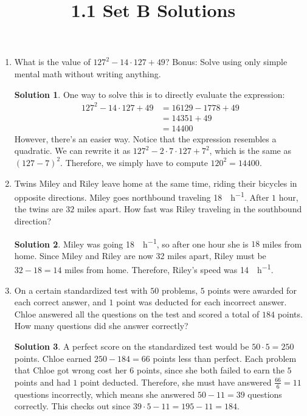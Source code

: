 \documentclass{article}
\title{1.1 Set B Solutions}
\author{}
\date{}
\theoremstyle{definition}
\newtheorem*{solution}{Solution}
\begin{document}
    \maketitle
    \begin{enumerate}
        \item What is the value of $127^2 - 14 \cdot 127 + 49$? Bonus: Solve using only simple mental math without writing anything.
        \begin{solution}
            One way to solve this is to directly evaluate the expression:
            \[\begin{split}
                127^2 - 14 \cdot 127 + 49 & = 16129 - 1778 + 49 \\
                & = 14351 + 49 \\
                & = 14400
            \end{split}\]
            However, there's an easier way. Notice that the expression resembles a quadratic. We can rewrite it as $127^2 - 2 \cdot 7 \cdot 127 + 7^2$, which is the same as $(127 - 7)^2$. Therefore, we simply have to compute $120^2 = 14400$.
        \end{solution}
        \item Twins Miley and Riley leave home at the same time, riding their bicycles in opposite directions. Miley goes northbound traveling \SI{18}{\mile\per\hour}. After $1$ hour, the twins are $32$ miles apart. How fast was Riley traveling in the southbound direction?
        \begin{solution}
            Miley was going \SI{18}{\mile\per\hour}, so after one hour she is $18$ miles from home. Since Miley and Riley are now 32 miles apart, Riley must be $32 - 18 = 14$ miles from home. Therefore, Riley's speed was \SI{14}{\mile\per\hour}.
        \end{solution}
        \item On a certain standardized test with $50$ problems, $5$ points were awarded for each correct answer, and $1$ point was deducted for each incorrect answer. Chloe answered all the questions on the test and scored a total of $184$ points. How many questions did she answer correctly?
        \begin{solution}
            A perfect score on the standardized test would be $50 \cdot 5 = 250$ points. Chloe earned $250 - 184 = 66$ points less than perfect. Each problem that Chloe got wrong cost her $6$ points, since she both failed to earn the $5$ points and had $1$ point deducted. Therefore, she must have answered $\frac{66}{6} = 11$ questions incorrectly, which means she answered $50 - 11 = 39$ questions correctly. This checks out since $39 \cdot 5 - 11 = 195 - 11 = 184$.


\end{solution}
\end{enumerate}
\end{document}
